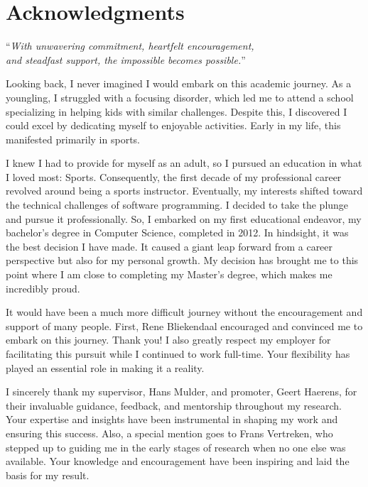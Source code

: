 \chapter*{Acknowledgments}
\small

\begin{center}
\enquote{\textit{With unwavering commitment, heartfelt encouragement, \\and steadfast support, the
impossible becomes possible.}}
\end{center}

Looking back, I never imagined I would embark on this academic journey. As a youngling, I
struggled with a focusing disorder, which led me to attend a school specializing in
helping kids with similar challenges. Despite this, I discovered I could excel by
dedicating myself to enjoyable activities. Early in my life, this manifested primarily in
sports.

I knew I had to provide for myself as an adult, so I pursued an education in what I loved
most: Sports. Consequently, the first decade of my professional career revolved around
being a sports instructor. Eventually, my interests shifted toward the technical
challenges of software programming. I decided to take the plunge and pursue it
professionally. So, I embarked on my first educational endeavor, my bachelor's degree in
Computer Science, completed in 2012. In hindsight, it was the best decision I have made.
It caused a giant leap forward from a career perspective but also for my personal growth.
My decision has brought me to this point where I am close to completing my Master's
degree, which makes me incredibly proud. 

It would have been a much more difficult journey without the encouragement and support of
many people. First, Rene Bliekendaal encouraged and convinced me to embark on this
journey. Thank you! I also greatly respect my employer for facilitating this pursuit while
I continued to work full-time. Your flexibility has played an essential role in making it
a reality.

I sincerely thank my supervisor, Hans Mulder, and promoter, Geert Haerens, for their
invaluable guidance, feedback, and mentorship throughout my research. Your expertise and
insights have been instrumental in shaping my work and ensuring this success. Also, a
special mention goes to Frans Vertreken, who stepped up to guiding me in the early
stages of research when no one else was available. Your knowledge and encouragement have
been inspiring and laid the basis for my result.

